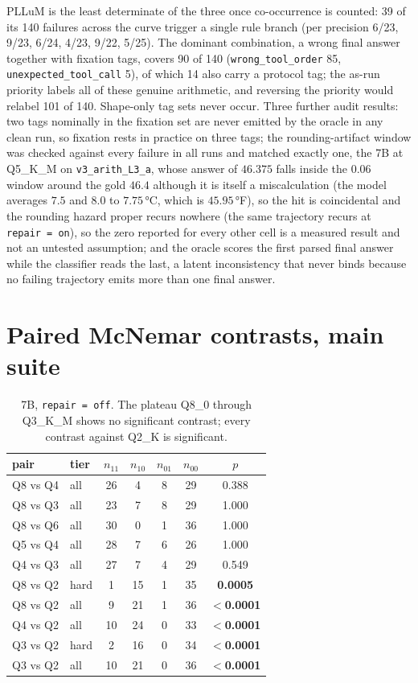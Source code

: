 \documentclass[11pt]{article}
\begin{document}
PLLuM is the least determinate of the three once co-occurrence is counted: 39 of its 140 failures across the curve trigger a single rule branch (per precision 6/23, 9/23, 6/24, 4/23, 9/22, 5/25). The dominant combination, a wrong final answer together with fixation tags, covers 90 of 140 (\texttt{wrong\_tool\_order} 85, \texttt{unexpected\_tool\_call} 5), of which 14 also carry a protocol tag; the as-run priority labels all of these genuine arithmetic, and reversing the priority would relabel 101 of 140. Shape-only tag sets never occur. Three further audit results: two tags nominally in the fixation set are never emitted by the oracle in any clean run, so fixation rests in practice on three tags; the rounding-artifact window was checked against every failure in all runs and matched exactly one, the 7B at Q5\_K\_M on \texttt{v3\_arith\_L3\_a}, whose answer of $46.375$ falls inside the $0.06$ window around the gold $46.4$ although it is itself a miscalculation (the model averages $7.5$ and $8.0$ to $7.75$\,°C, which is $45.95$\,°F), so the hit is coincidental and the rounding hazard proper recurs nowhere (the same trajectory recurs at \texttt{repair\,=\,on}), so the zero reported for every other cell is a measured result and not an untested assumption; and the oracle scores the first parsed final answer while the classifier reads the last, a latent inconsistency that never binds because no failing trajectory emits more than one final answer.

\FloatBarrier
\Needspace*{0.45\textheight}
\section{Paired McNemar contrasts, main suite}
\label{app:mcnemar}

\begin{table}[h]
\centering\small
\caption{7B, \texttt{repair\,=\,off}. The plateau Q8\_0 through Q3\_K\_M shows no significant contrast; every contrast against Q2\_K is significant.}
\label{tab:mcnemar7b}
\begin{tabular}{llccccc}
\toprule
pair & tier & $n_{11}$ & $n_{10}$ & $n_{01}$ & $n_{00}$ & $p$ \\
\midrule
Q8 vs Q4 & all  & 26 & 4 & 8 & 29 & 0.388 \\
Q8 vs Q3 & all  & 23 & 7 & 8 & 29 & 1.000 \\
Q8 vs Q6 & all  & 30 & 0 & 1 & 36 & 1.000 \\
Q5 vs Q4 & all  & 28 & 7 & 6 & 26 & 1.000 \\
Q4 vs Q3 & all  & 27 & 7 & 4 & 29 & 0.549 \\
Q8 vs Q2 & hard & 1  & 15& 1 & 35& \textbf{0.0005} \\
Q8 vs Q2 & all  & 9  & 21& 1 & 36& \textbf{$<$0.0001} \\
Q4 vs Q2 & all  & 10 & 24& 0 & 33& \textbf{$<$0.0001} \\
Q3 vs Q2 & hard & 2  & 16& 0 & 34& \textbf{$<$0.0001} \\
Q3 vs Q2 & all  & 10 & 21& 0 & 36& \textbf{$<$0.0001} \\
\bottomrule
\end{tabular}
\end{table}
\end{document}
